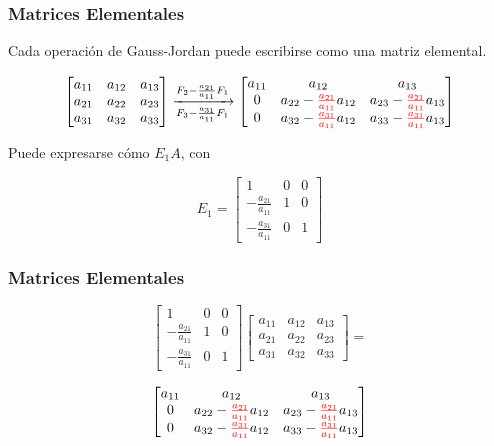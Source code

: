 \documentclass[xcolor=svgnames]{beamer} %
\theoremstyle{plain}
\theoremstyle{definition}
\begin{document}
\begin{frame}
\frametitle{Matrices Elementales}
Cada operación de Gauss-Jordan puede escribirse como una matriz elemental.

$$\begin{bmatrix}
a_{11} & a_{12} & a_{13}\\
a_{21} & a_{22} & a_{23}\\
a_{31} & a_{32} & a_{33}
\end{bmatrix} \xrightarrow[F_3 - \frac{a_{31}}{a_{11}}F_1]{F_2 - \frac{a_{21}}{a_{11}}F_1}
\begin{bmatrix}
a_{11} & a_{12} & a_{13}\\
0 & a_{22}- {\color{red}\frac{a_{21}}{a_{11}}} a_{12} & a_{23}-{\color{red}\frac{a_{21}}{a_{11}}}a_{13}\\
0 & a_{32}- {\color{red}\frac{a_{31}}{a_{11}}} a_{12} & a_{33}-{\color{red}\frac{a_{31}}{a_{11}}}a_{13}
\end{bmatrix}$$


Puede expresarse cómo $E_1 A$, con 

$$E_1 =\begin{bmatrix}
1 & 0 & 0\\
-\frac{a_{21}}{a_{11}} & 1 & 0\\
-\frac{a_{31}}{a_{11}} & 0 & 1
\end{bmatrix}$$


\end{frame}

\begin{frame}
\frametitle{Matrices Elementales}
$$\begin{bmatrix}
1 & 0 & 0\\
-\frac{a_{21}}{a_{11}} & 1 & 0\\
-\frac{a_{31}}{a_{11}} & 0 & 1
\end{bmatrix}  \begin{bmatrix}
a_{11} & a_{12} & a_{13}\\
a_{21} & a_{22} & a_{23}\\
a_{31} & a_{32} & a_{33}
\end{bmatrix} = $$


$$\begin{bmatrix}
a_{11} & a_{12} & a_{13}\\
0 & a_{22}- {\color{red}\frac{a_{21}}{a_{11}}} a_{12} & a_{23}-{\color{red}\frac{a_{21}}{a_{11}}}a_{13}\\
0 & a_{32}- {\color{red}\frac{a_{31}}{a_{11}}} a_{12} & a_{33}-{\color{red}\frac{a_{31}}{a_{11}}}a_{13}
\end{bmatrix}$$
\end{frame}
\end{document}
